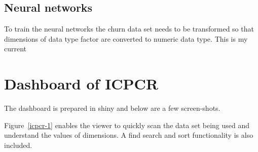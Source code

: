 \subsection{Neural networks}
To train the neural networks the churn data set needs to be transformed so that dimensions of data type factor are converted to numeric data type. This is my current 

\section{Dashboard of ICPCR}
The dashboard is prepared in shiny and below are a few screen-shots.

Figure~\ref{icpcr-1} enables the viewer to quickly scan the data set being used and understand the values of dimensions. A find search and sort functionality is also included.



